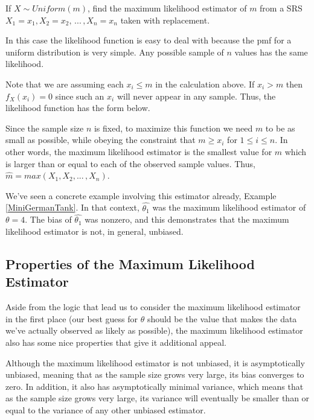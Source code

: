 \begin{examp}\label{TankProblemMLE}
If $X \sim Uniform(m)$, find the maximum likelihood estimator of $m$ from a SRS $X_1 = x_1, X_2 = x_2, \, ... \,, X_n = x_n$ taken with replacement.
\par
\noindent In this case the likelihood function is easy to deal with because the pmf for a uniform distribution is very simple. Any possible sample of $n$ values has the same likelihood.
\par
\noindent Note that we are assuming each $x_i \leq m$ in the calculation above. If $x_i > m$ then $f_X(x_i) = 0$ since such an $x_i$ will never appear in any sample. Thus, the likelihood function has the form below.
\renewcommand*{\arraystretch}{1.35}
\renewcommand*{\arraystretch}{1}
\par
\noindent Since the sample size $n$ is fixed, to maximize this function we need $m$ to be as small as possible, while obeying the constraint that $m \geq x_i$ for $1 \leq i \leq n$. In other words, the maximum likelihood estimator is the smallest value for $m$ which is larger than or equal to each of the observed sample values. Thus, $\widehat{m} = max(X_1,X_2, ...\,, X_n)$.
\end{examp}
\par
We've seen a concrete example involving this estimator already, Example \ref{MiniGermanTank}. In that context, $\widehat{\theta_1}$ was the maximum likelihood estimator of $\theta = 4$. The bias of $\widehat{\theta_1}$ was nonzero, and this demonstrates that the maximum likelihood estimator is not, in general, unbiased.

\subsection*{Properties of the Maximum Likelihood Estimator}

Aside from the logic that lead us to consider the maximum likelihood estimator in the first place (our best guess for $\theta$ should be the value that makes the data we've actually observed as likely as possible), the maximum likelihood estimator also has some nice properties that give it additional appeal.
\par
Although the maximum likelihood estimator is not unbiased, it is asymptotically unbiased, meaning that as the sample size grows very large, its bias converges to zero. In addition, it also has asymptotically minimal variance, which means that as the sample size grows very large, its variance will eventually be smaller than or equal to the variance of any other unbiased estimator.

